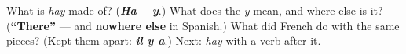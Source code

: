 \begin{tcolorbox}[breakable,colback=teal!4,colframe=teal!35!black,title={Before you move on}]
What is \emph{hay} made of? (\emph{\textbf{Ha}} + \emph{\textbf{y}}.) What does the \emph{y} mean, and where else is it? (\textbf{\textquotedblleft{}There\textquotedblright{}} — and \textbf{nowhere else} in Spanish.) What did French do with the same pieces? (Kept them apart: \emph{\textbf{il y a}}.) Next: \emph{hay} with a verb after it.
\end{tcolorbox}
